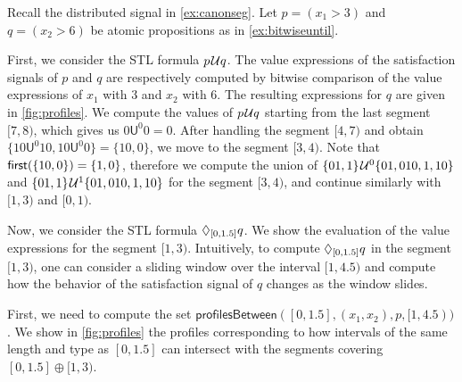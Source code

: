 \begin{example}
	Recall the distributed signal in \cref{ex:canonseg}.
	Let $p = (x_1 > 3)$ and $q = (x_2 > 6)$ be atomic propositions as in \cref{ex:bitwiseuntil}.
		
	First, we consider the STL formula $p \kern.1em\mathcal{U} q$.
	The value expressions of the satisfaction signals of $p$ and $q$ are respectively computed by bitwise comparison of the value expressions of $x_1$ with 3 and $x_2$ with 6.
	The resulting expressions for $q$ are given in \cref{fig:profiles}.
	We compute the values of $p \kern.1em\mathcal{U} q$ starting from the last segment $[7,8)$, which gives us $0 \mathsf{U}^0 0 = 0$.
	After handling the segment $[4,7)$ and obtain $\{ 10 \mathsf{U}^0 10, 10 \mathsf{U}^0 0 \} = \{10, 0\}$, we move to the segment $[3,4)$.
	Note that $\textsf{first}(\{10, 0\}) = \{1,0\}$, therefore we compute the union of $\{01, 1\} \kern.1em\mathcal{U}^0 \{01, 010, 1, 10\}$ and $\{01, 1\} \kern.1em\mathcal{U}^1 \{01, 010, 1, 10\}$ for the segment $[3,4)$, and continue similarly with $[1,3)$ and $[0,1)$.
	
	Now, we consider the STL formula $\lozenge_{[0,1.5]} q$.
	We show the evaluation of the value expressions for the segment $[1,3)$.
	Intuitively, to compute $\lozenge_{[0,1.5]} q$ in the segment $[1,3)$, one can consider a sliding window over the interval $[1,4.5)$ and compute how the behavior of the satisfaction signal of $q$ changes as the window slides.
		
	First, we need to compute the set $\mathsf{profilesBetween}([0,1.5], (x_1, x_2), p, [1,4.5))$.
	We show in \cref{fig:profiles} the profiles corresponding to how intervals of the same length and type as $[0,1.5]$ can intersect with the segments covering $[0,1.5] \oplus [1,3)$.
	

\end{example}
